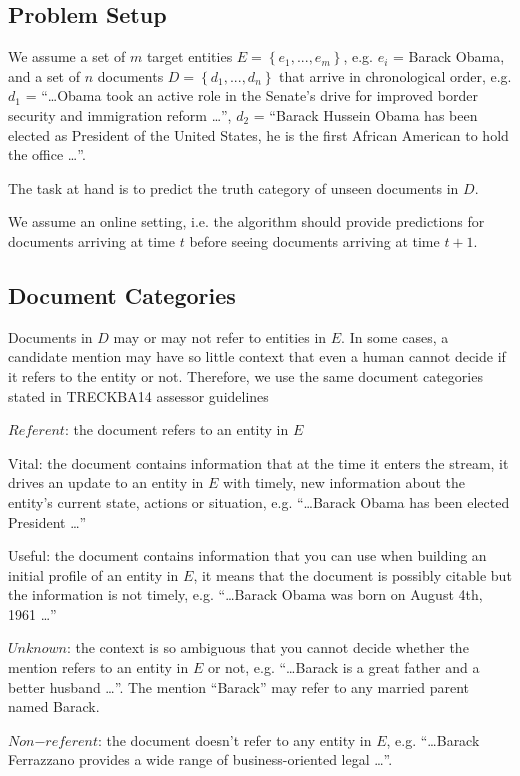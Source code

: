 \documentclass{article}
\begin{document}
\subsection{Problem Setup}
\label{setup}

We assume a set of $m$ target entities $E = \left\{ {e_1, ..., e_m}\right\}$, e.g. $e_i$ = Barack Obama, and a set of $n$ documents $D = \left\{ {d_1, ..., d_n}\right\}$ that arrive in chronological order, e.g. $d_1$ = ``\dots Obama took an active role in the Senate's drive for improved border security and immigration reform \dots'', $d_2$ = ``Barack Hussein Obama has been elected as President of the United States, he is the first African American to hold the office \dots''.

The task at hand is to predict the truth category of unseen documents in $D$.

We assume an online setting, i.e. the algorithm should provide predictions for documents arriving at time $t$ before seeing documents arriving at time $t+1$.

\subsection{Document Categories}

Documents in $D$ may or may not refer to entities in $E$. In some cases, a candidate mention may have so little context that even a human cannot decide if it refers to the entity or not. Therefore, we use the same document categories stated in TRECKBA14 assessor guidelines

\begin{itemize*}
  \item $Referent$: the document refers to an entity in $E$
    \begin{itemize*}
      \item Vital: the document contains information that at the time it enters the stream, it drives an update to an entity in $E$ with timely, new information about the entity's current state, actions or situation, e.g. ``\dots Barack Obama has been elected President \dots''
      \item Useful: the document contains information that you can use when building an initial profile of an entity in $E$, it means that the document is possibly citable but the information is not timely, e.g. ``\dots Barack Obama was born on August 4th, 1961 \dots''
    \end{itemize*}
  \item $Unknown$: the context is so ambiguous that you cannot decide whether the mention refers to an entity in $E$ or not, e.g. ``\dots Barack is a great father and a better husband \dots''. The mention ``Barack'' may refer to any married parent named Barack.
  \item $Non\mathord{-}referent$: the document doesn't refer to any entity in $E$, e.g. ``\dots Barack Ferrazzano provides a wide range of business-oriented legal \dots''.
\end{itemize*}
\end{document}

